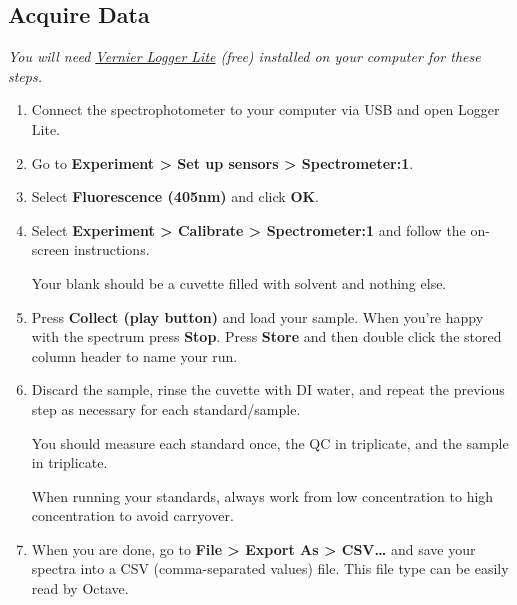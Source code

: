 \documentclass[]{tufte-book}
\begin{document}
\hypertarget{acquire-data}{%
\subsection{Acquire Data}\label{acquire-data}}

\emph{You will need \href{https://www.vernier.com/products/software/logger-lite/\#section5}{Vernier Logger Lite} (free) installed on your computer for these steps.}

\begin{enumerate}
\def\labelenumi{\arabic{enumi}.}
\item
  Connect the spectrophotometer to your computer via USB and open Logger Lite.\\
\item
  Go to \textbf{Experiment \textgreater{} Set up sensors \textgreater{} Spectrometer:1}.\\
\item
  Select \textbf{Fluorescence (405nm)} and click \textbf{OK}.\\
\item
  Select \textbf{Experiment \textgreater{} Calibrate \textgreater{} Spectrometer:1} and follow the on-screen instructions.

  \begin{marginfigure}
   Your blank should be a cuvette filled with solvent and nothing else.
   \end{marginfigure}
\item
  Press \textbf{Collect (play button)} and load your sample. When you're happy with the spectrum press \textbf{Stop}. Press \textbf{Store} and then double click the stored column header to name your run.
\item
  Discard the sample, rinse the cuvette with DI water, and repeat the previous step as necessary for each standard/sample.

  \begin{marginfigure}
   You should measure each standard once, the QC in triplicate, and the
   sample in triplicate.

   When running your standards, always work from low concentration to high
   concentration to avoid carryover.
   \end{marginfigure}
\item
  When you are done, go to \textbf{File \textgreater{} Export As \textgreater{} CSV\ldots{}} and save your spectra into a CSV (comma-separated values) file. This file type can be easily read by Octave.
\end{enumerate}
\end{document}
